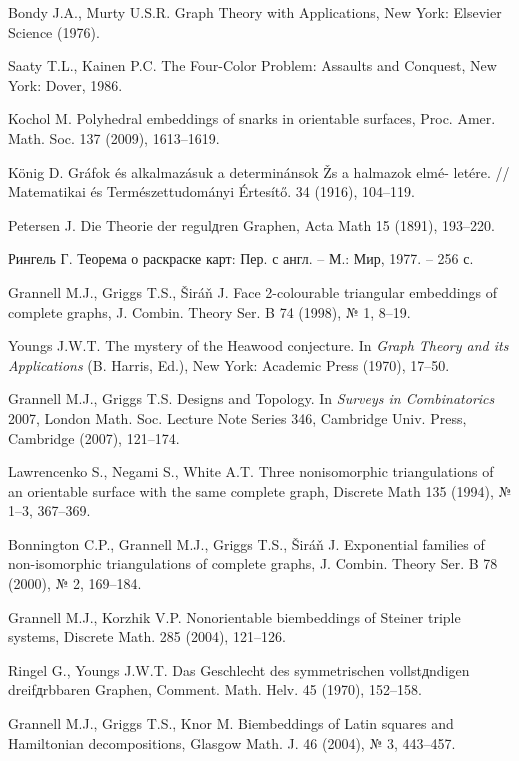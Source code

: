 \begin{thebibliography}{1}
{Bondy J.A., Murty U.S.R.} Graph Theory with Applications, New York: Elsevier Science (1976).

{Saaty T.L., Kainen P.C.} The Four-Color Problem: Assaults and Conquest, New York: Dover, 1986.

{Kochol M.} Polyhedral embeddings of snarks in orientable surfaces, Proc. Amer. Math. Soc. 137 (2009), 1613--1619.

{König D.} Gráfok és alkalmazásuk a determinánsok Žs a halmazok elmé- letére. // Matematikai és Természettudományi Értesítő. 34 (1916), 104--119.

{Petersen J.} Die Theorie der regulдren Graphen, Acta Math 15 (1891), 193--220.

{Рингель Г.} Теорема о раскраске карт: Пер. с англ. -- М.: Мир, 1977. -- 256 с.

{Grannell M.J., Griggs T.S., Širáň J.} Face 2-colourable triangular embeddings of complete graphs, J. Combin. Theory Ser. B 74 (1998), № 1, 8--19.

{Youngs J.W.T.} The mystery of the Heawood conjecture. In \textit{Graph Theory and its Applications} (B. Harris, Ed.), New York: Academic Press (1970), 17--50.

{Grannell M.J., Griggs T.S.} Designs and Topology. In \textit{Surveys in Combinatorics} 2007, London Math. Soc. Lecture Note Series 346, Cambridge Univ. Press, Cambridge (2007), 121--174.

{Lawrencenko S., Negami S., White A.T.} Three nonisomorphic triangulations of an orientable surface with the same complete graph, Discrete Math 135 (1994), № 1--3, 367--369.

{Bonnington C.P., Grannell M.J., Griggs T.S., Širáň J.} Exponential families of non-isomorphic triangulations of complete graphs, J. Combin. Theory Ser. B 78 (2000), № 2, 169--184.

{Grannell M.J., Korzhik V.P.} Nonorientable biembeddings of Steiner triple systems, Discrete Math. 285 (2004), 121--126.

{Ringel G., Youngs J.W.T.} Das Geschlecht des symmetrischen vollstдndigen dreifдrbbaren Graphen, Comment. Math. Helv. 45 (1970), 152--158.

{Grannell M.J., Griggs T.S., Knor M.} Biembeddings of Latin squares and Hamiltonian decompositions, Glasgow Math. J. 46 (2004), № 3, 443--457.


\end{thebibliography}
